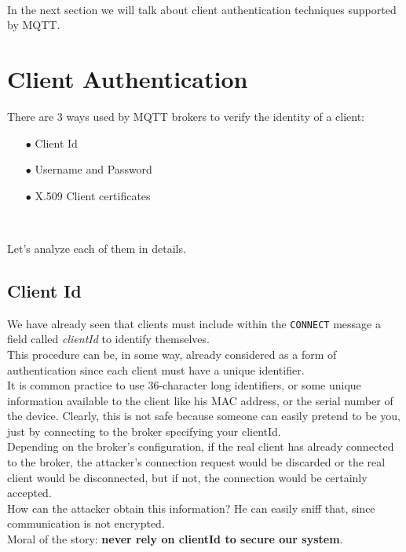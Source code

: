 \documentclass[12pt]{report}
\begin{document}
{\begin{itemize}
\end{itemize}\

In the next section we will talk about client authentication techniques supported by MQTT.


\section{Client Authentication}
\bigskip

There are 3 ways used by MQTT brokers to verify the identity of a client:

\begin{itemize}
\setlength{\itemindent}{+4mm}
  \item[$\bullet$] Client Id
  \item[$\bullet$] Username and Password
  \item[$\bullet$] X.509 Client certificates
\end{itemize}\

Let's analyze each of them in details.\\


\subsection{Client Id}
\bigskip
We have already seen that clients must include within the \texttt{CONNECT} message a field called \textit{clientId} to identify themselves.\\
This procedure can be, in some way, already considered as a form of authentication since each client must have a unique identifier.\\
It is common practice to use 36-character long identifiers, or some unique information available to the client like his MAC address, or the serial number of the device.
Clearly, this is not safe because someone can easily pretend to be you, just by connecting to the broker specifying your clientId.\\
Depending on the broker's configuration, if the real client has already connected to the broker, the attacker's connection request would be discarded or the real client would be disconnected, but if not, the connection would be certainly accepted.\\

How can the attacker obtain this information? He can easily sniff that, since communication is not encrypted.\\

Moral of the story: \textbf{never rely on clientId to secure our system}.\\

}
\end{document}
